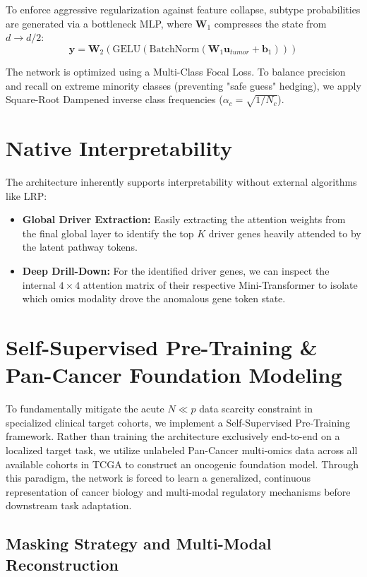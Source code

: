 \documentclass[10pt, twocolumn]{article}
\begin{document}
To enforce aggressive regularization against feature collapse, subtype probabilities are generated via a bottleneck MLP, where $\mathbf{W}_1$ compresses the state from $d \rightarrow d/2$:
\begin{equation}
    \hat{\mathbf{y}} = \mathbf{W}_2(\text{GELU}(\text{BatchNorm}(\mathbf{W}_1\mathbf{u}_{tumor} + \mathbf{b}_1)))
\end{equation}

The network is optimized using a Multi-Class Focal Loss. To balance precision and recall on extreme minority classes (preventing "safe guess" hedging), we apply Square-Root Dampened inverse class frequencies ($\alpha_c = \sqrt{1 / N_c}$).

\section{Native Interpretability}
The architecture inherently supports interpretability without external algorithms like LRP:
\begin{itemize}
    \item \textbf{Global Driver Extraction:} Easily extracting the attention weights from the final global layer to identify the top $K$ driver genes heavily attended to by the latent pathway tokens.
    \item \textbf{Deep Drill-Down:} For the identified driver genes, we can inspect the internal $4 \times 4$ attention matrix of their respective Mini-Transformer to isolate which omics modality drove the anomalous gene token state.
\end{itemize}

\section{Self-Supervised Pre-Training \& Pan-Cancer Foundation Modeling}

To fundamentally mitigate the acute $N \ll p$ data scarcity constraint in specialized clinical target cohorts, we implement a Self-Supervised Pre-Training framework. Rather than training the architecture exclusively end-to-end on a localized target task, we utilize unlabeled Pan-Cancer multi-omics data across all available cohorts in TCGA to construct an oncogenic foundation model. Through this paradigm, the network is forced to learn a generalized, continuous representation of cancer biology and multi-modal regulatory mechanisms before downstream task adaptation.

\subsection{Masking Strategy and Multi-Modal Reconstruction}
\end{document}
